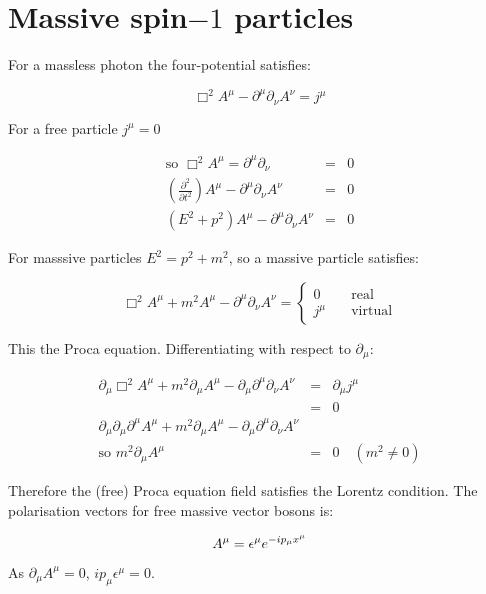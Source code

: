 \chapter{Massive spin\texorpdfstring{$-1$}{1} particles}

For a massless photon the four-potential satisfies:

\[
  \Box^2A^{\mu} - \partial^{\mu}\partial_{\nu}A^{\nu} = j^{\mu}
\]

For a free particle $j^{\mu} = 0$

\begin{eqnarray*}
  \textrm{so }\Box^2A^{\mu} = \partial^{\mu}\partial_{\nu} & = & 0 \\
  \left( \frac{\partial^2}{\partial t^2}\right)A^{\mu} - \partial^{\mu}\partial_{\nu}A^{\nu} & = & 0 \\
  \left(E^2 + p^2\right)A^{\mu} - \partial^{\mu}\partial_{\nu}A^{\nu} & = & 0
\end{eqnarray*}

For masssive particles $E^2 = p^2 + m^2$, so a massive particle satisfies:

\[
  \Box^2A^{\mu} + m^2A^{\mu}-\partial^{\mu}\partial_{\nu} A^{\nu} = 
  \left\{
    \begin{array}{cc}
    0 & \quad\textrm{real} \\
    j^{\mu} & \quad\textrm{virtual}
    \end{array}
  \right.
\]

This the Proca equation.  Differentiating with respect to $\partial_{\mu}$:

\begin{eqnarray*}
  \partial_{\mu}\Box^2A^{\mu} + m^2\partial_{\mu}A^{\mu} - \partial_{\mu}\partial^{\mu}\partial_{\nu}A^{\nu} & = & \partial_{\mu}j^{\mu} \\
  & = & 0 \\
  \partial_{\mu}\partial_{\mu}\partial^{\mu}A^{\mu} + m^2 \partial_{\mu}A^{\mu} - \partial_{\mu}\partial^{\mu}\partial_{\nu}A^{\nu} \\
  \textrm{so } m^2\partial_{\mu}A^{\mu} & = & 0 \quad (m^2 \neq 0)
\end{eqnarray*}

Therefore the (free) Proca equation field satisfies the Lorentz condition.  The polarisation vectors for free massive vector bosons is:

\[
  A^{\mu} = \epsilon^{\mu}e^{-ip_{\mu}x^{\mu}}
\]

As $\partial_{\mu}A^{\mu} = 0$, $ip_{\mu}\epsilon^{\mu} = 0$.

